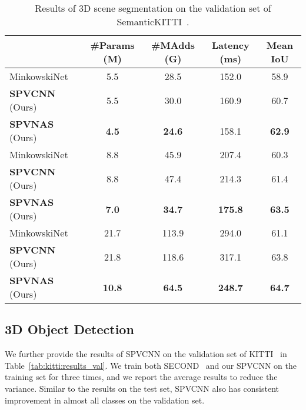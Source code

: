 \documentclass[runningheads]{llncs}
\newcommand{\tab}[1]{Table~\ref{#1}}
\def\cnnshort{SPVCNN\xspace}
\def\modelshort{SPVNAS\xspace}
\begin{document}
\begin{table}[t]
\setlength{\tabcolsep}{7pt}
\small\centering
\begin{tabular}{lcccc}
    \toprule
     & \#Params (M) & \#MAdds (G) & Latency (ms) & Mean IoU \\
    \midrule
    MinkowskiNet~\cite{choy20194d} & 5.5 & 28.5 & 152.0 & 58.9 \\
    \textbf{\cnnshort} (Ours) & 5.5 & 30.0 & 160.9 & 60.7 \\
    \textbf{\modelshort} (Ours) & \textbf{4.5} & \textbf{24.6} & 158.1 & \textbf{62.9} \\ \midrule
    MinkowskiNet~\cite{choy20194d} & 8.8 & 45.9 & 207.4 & 60.3 \\
    \textbf{\cnnshort} (Ours) & 8.8 & 47.4 & 214.3 & 61.4 \\
    \textbf{\modelshort} (Ours) & \textbf{7.0} & \textbf{34.7} & \textbf{175.8} & \textbf{63.5} \\ \midrule
    MinkowskiNet~\cite{choy20194d} & 21.7 & 113.9 & 294.0 & 61.1 \\
    \textbf{\cnnshort} (Ours) & 21.8 & 118.6 & 317.1 & 63.8 \\
    \textbf{\modelshort} (Ours) & \textbf{10.8} & \textbf{64.5} & \textbf{248.7} & \textbf{64.7} \\ 
    \bottomrule
\end{tabular}
\caption{Results of 3D scene segmentation on the validation set of SemanticKITTI~\cite{behley2019semantickitti}.}
\label{tab:semantickitti:results_val}
\end{table} 
\subsection{3D Object Detection}

We further provide the results of \cnnshort on the validation set of KITTI~\cite{geiger2012kitti} in \tab{tab:kitti:results_val}. We train both SECOND~\cite{yan2018second} and our \cnnshort on the training set for three times, and we report the average results to reduce the variance. Similar to the results on the test set, \cnnshort also has consistent improvement in almost all classes on the validation set.
\end{document}
